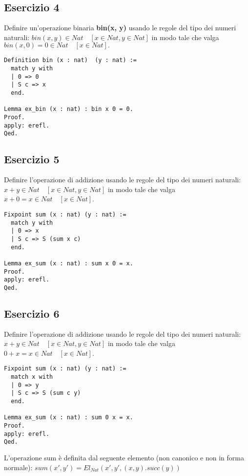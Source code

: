 \subsection{Esercizio 4}

Definire un'operazione binaria \textbf{bin(x, y)} usando le regole del tipo dei numeri
naturali: $bin(x, y) \in Nat \quad [x \in Nat, y \in Nat]$
in modo tale che valga $bin(x, 0) = 0 \in Nat \quad [x \in Nat].$

\begin{lstlisting}[language=Coq]
Definition bin (x : nat)  (y : nat) :=
  match y with
  | 0 => 0
  | S c => x
  end.

Lemma ex_bin (x : nat) : bin x 0 = 0.
Proof.
apply: erefl.
Qed.
\end{lstlisting}

\subsection{Esercizio 5}

Definire l'operazione di addizione usando le regole del tipo dei numeri naturali:
$x + y \in Nat \quad [x \in Nat, y \in Nat]$
in modo tale che valga $x + 0 = x \in Nat \quad [x \in Nat]$.

\begin{lstlisting}[language=Coq]
Fixpoint sum (x : nat) (y : nat) :=
  match y with
  | 0 => x
  | S c => S (sum x c)
  end.

Lemma ex_sum (x : nat) : sum x 0 = x.
Proof.
apply: erefl.
Qed.
\end{lstlisting}

\subsection{Esercizio 6}

Definire l'operazione di addizione usando le regole del tipo dei numeri naturali:
$x + y \in Nat \quad [x \in Nat, y \in Nat]$
in modo tale che valga $0 + x = x \in Nat \quad [x \in Nat]$.

\begin{lstlisting}[language=Coq]
Fixpoint sum (x : nat) (y : nat) :=
  match x with
  | 0 => y
  | S c => S (sum c y)
  end.

Lemma ex_sum (x : nat) : sum 0 x = x.
Proof.
apply: erefl.
Qed.
\end{lstlisting}

L'operazione sum è definita dal seguente elemento (non canonico e non in
forma normale): $sum(x',y') = El_{Nat}(x',y',(x,y).succ(y))$

